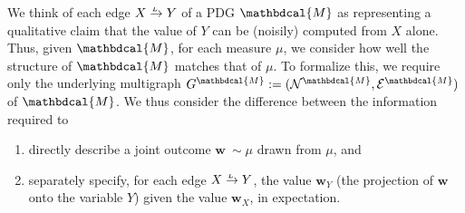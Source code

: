 \documentclass{article}
\theoremstyle{plain}
\theoremstyle{definition}
\theoremstyle{remark}
\newcommand\mat[1]{\mathbf{#1}}
\newcommand{\N}{\mathcal N}
\newcommand{\Ed}{\mathcal E}
\newcommand{\dg}[1]{\mathbdcal{#1}}
\newcommand{\ed}[3]{#2
  \overset{\smash{\mskip-5mu\raisebox{-1pt}{$\scriptscriptstyle
        #1$}}}{\rightarrow} #3}
\numberwithin{equation}{section}
\begin{document}
We think of each edge $\ed LXY$ of a PDG $\dg M$ as representing a
qualitative claim that the value of $Y$ can be (noisily) computed from $X$ alone. 
%
Thus, given ${\dg M}$, for each measure $\mu$, we consider how well
the structure of ${\dg M}$ matches that of $\mu$.
To formalize this, we require only the underlying multigraph $G^{\dg M} :=
(\N^{\dg M}, \Ed^{\dg M})$ of $\dg M$. 
%
We thus consider the difference between the
information required to 
\begin{enumerate}[label=(\alph*)]
\item directly describe a joint outcome  $\mat w ~ \sim \mu$
          drawn from $\mu$, and 
	\item separately specify, for each edge $\ed LXY$, the value
          $\mat w_Y$ (the projection of $\mat w$ onto the variable
          $Y$) given the value $\mat w_X$, in expectation. 
\end{enumerate}
\end{document}
